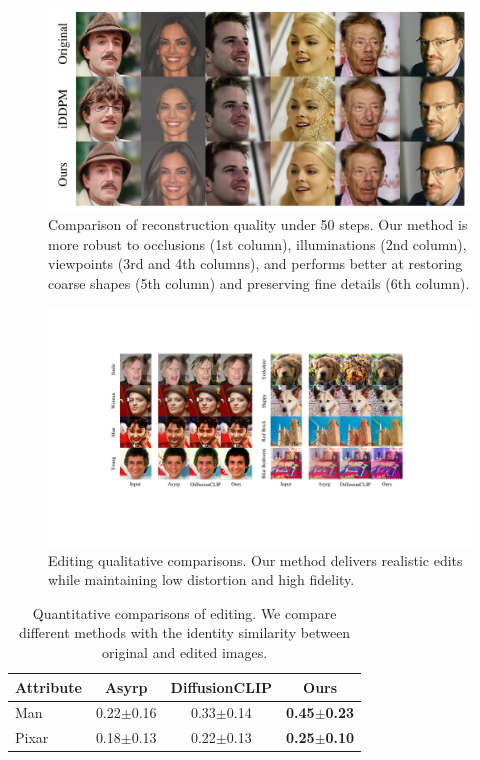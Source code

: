 \documentclass[letterpaper]{article} %
\begin{document}
\begin{figure}[t]
    \centering
    \includegraphics[width=1\columnwidth]{Figs/fig4.pdf}
    \caption{Comparison of reconstruction quality under 50 steps. Our method is more robust to occlusions (1st column), illuminations (2nd column), viewpoints (3rd and 4th columns), and performs better at restoring coarse shapes (5th column) and preserving fine details (6th column).}
    \label{fig4}
\end{figure}

\begin{figure}[t]
    \centering
    \includegraphics[width=1\textwidth]{Figs/fig5.pdf}
    \caption{Editing qualitative comparisons. Our method delivers realistic edits while maintaining low distortion and high fidelity.}
    \label{fig5}
\end{figure}

\begin{table}[t]
    \centering
    \caption{Quantitative comparisons of editing. We compare different methods with the identity similarity between original and edited images.}
    \label{tab:2}
    \renewcommand\arraystretch{1.1}
    \begin{tabular}{l | c c c }
        \hline
        Attribute & Asyrp & DiffusionCLIP & Ours \\
        \hline
        Man & 0.22$\pm$0.16 & 0.33$\pm$0.14 & \textbf{0.45$\pm$0.23} \\
        Pixar & 0.18$\pm$0.13 & 0.22$\pm$0.13 & \textbf{0.25$\pm$0.10}\\
         \hline
    \end{tabular}
\end{table}
\end{document}
